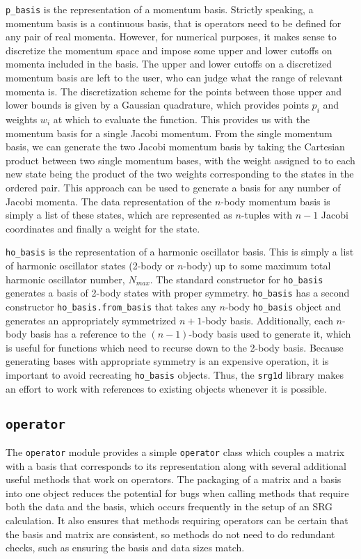 \texttt{p\_basis} is the representation of a momentum basis. Strictly speaking, a momentum basis is a continuous basis, that is operators need to be defined for any pair of real momenta. However, for numerical purposes, it makes sense to discretize the momentum space and impose some upper and lower cutoffs on momenta included in the basis. The upper and lower cutoffs on a discretized momentum basis are left to the user, who can judge what the range of relevant momenta is. The discretization scheme for the points between those upper and lower bounds is given by a Gaussian quadrature, which provides points $p_i$ and weights $w_i$ at which to evaluate the function. This provides us with the momentum basis for a single Jacobi momentum. From the single momentum basis, we can generate the two Jacobi momentum basis by taking the Cartesian product between two single momentum bases, with the weight assigned to to each new state being the product of the two weights corresponding to the states in the ordered pair. This approach can be used to generate a basis for any number of Jacobi momenta. The data representation of the $n$-body momentum basis is simply a list of these states, which are represented as $n$-tuples with $n-1$ Jacobi coordinates and finally a weight for the state.

\texttt{ho\_basis} is the representation of a harmonic oscillator basis. This is simply a list of harmonic oscillator states (2-body or $n$-body) up to some maximum total harmonic oscillator number, $N_{max}$. The standard constructor for \texttt{ho\_basis} generates a basis of 2-body states with proper symmetry. \texttt{ho\_basis} has a second constructor \texttt{ho\_basis.from\_basis} that takes any $n$-body \texttt{ho\_basis} object and generates an appropriately symmetrized $n+1$-body basis. Additionally, each $n$-body basis has a reference to the $(n-1)$-body basis used to generate it, which is useful for functions which need to recurse down to the 2-body basis. Because generating bases with appropriate symmetry is an expensive operation, it is important to avoid recreating \texttt{ho\_basis} objects. Thus, the \texttt{srg1d} library makes an effort to work with references to existing objects whenever it is possible.

\subsection{\texttt{operator}}

The \texttt{operator} module provides a simple \texttt{operator} class which couples a matrix with a basis that corresponds to its representation along with several additional useful methods that work on operators. The packaging of a matrix and a basis into one object reduces the potential for bugs when calling methods that require both the data and the basis, which occurs frequently in the setup of an SRG calculation. It also ensures that methods requiring operators can be certain that the basis and matrix are consistent, so methods do not need to do redundant checks, such as ensuring the basis and data sizes match.

